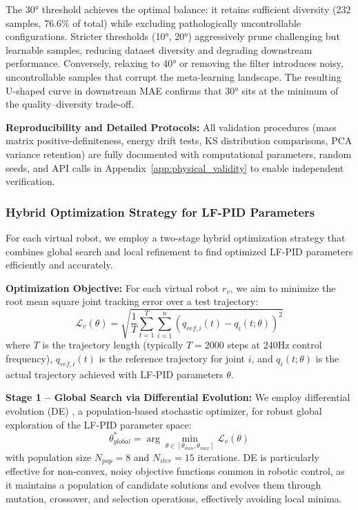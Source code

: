 \documentclass[DTMColor]{ROB-New}
\begin{document}
{\color{blue}The 30° threshold achieves the optimal balance: it retains sufficient diversity (232 samples, 76.6\% of total) while excluding pathologically uncontrollable configurations. Stricter thresholds (10°, 20°) aggressively prune challenging but learnable samples, reducing dataset diversity and degrading downstream performance. Conversely, relaxing to 40° or removing the filter introduces noisy, uncontrollable samples that corrupt the meta-learning landscape. The resulting U-shaped curve in downstream MAE confirms that 30° sits at the minimum of the quality--diversity trade-off.}

\textbf{Reproducibility and Detailed Protocols:} All validation procedures (mass matrix positive-definiteness, energy drift tests, KS distribution comparisons, PCA variance retention) are fully documented with computational parameters, random seeds, and API calls in Appendix~\ref{app:physical_validity} to enable independent verification.

\subsubsection{Hybrid Optimization Strategy for LF-PID Parameters}

For each virtual robot, we employ a two-stage hybrid optimization strategy that combines global search and local refinement to find optimized LF-PID parameters efficiently and accurately.

\textbf{Optimization Objective:} For each virtual robot $r_v$, we aim to minimize the root mean square joint tracking error over a test trajectory:
\begin{equation}
    \mathcal{L}_v(\theta) = \sqrt{\frac{1}{T} \sum_{t=1}^{T} \sum_{i=1}^{n} \left( q_{ref,i}(t) - q_i(t; \theta) \right)^2}
\end{equation}
where $T$ is the trajectory length (typically $T=2000$ steps at 240Hz control frequency), $q_{ref,i}(t)$ is the reference trajectory for joint $i$, and $q_i(t; \theta)$ is the actual trajectory achieved with LF-PID parameters $\theta$.

\textbf{Stage 1 -- Global Search via Differential Evolution:} We employ differential evolution (DE) \cite{storn1997differential}, a population-based stochastic optimizer, for robust global exploration of the LF-PID parameter space:
\begin{equation}
    \theta^*_{global} = \arg\min_{\theta \in [\theta_{min}, \theta_{max}]} \mathcal{L}_v(\theta)
\end{equation}
with population size $N_{pop}=8$ and $N_{iter}=15$ iterations. DE is particularly effective for non-convex, noisy objective functions common in robotic control, as it maintains a population of candidate solutions and evolves them through mutation, crossover, and selection operations, effectively avoiding local minima.
\end{document}
